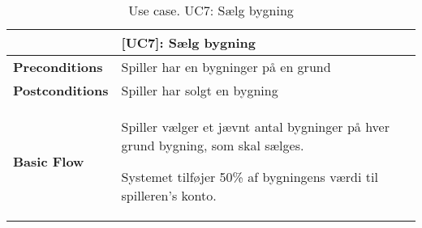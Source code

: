 \documentclass[class=article, crop=false]{standalone}
\begin{document}
    \begin{table}[H]
        \caption{Use case. UC7: Sælg bygning}
        \begin{tabularx}{\textwidth}{|l|X|}
            \hline
            & \textbf{[UC7]: Sælg bygning}   \\ \hline
            \textbf{Preconditions}       & Spiller har en bygninger på en grund\\ \hline
            \textbf{Postconditions}      & Spiller har solgt en bygning\\ \hline


            \textbf{Basic Flow} & \begin{tabenum}
                                      \item Spiller vælger et jævnt antal bygninger på hver grund bygning, som skal sælges.
                                      \item Systemet tilføjer 50\% af bygningens værdi til spilleren's konto.
            \end{tabenum}   \\ \hline

        \end{tabularx}


    \end{table}
\end{document}
